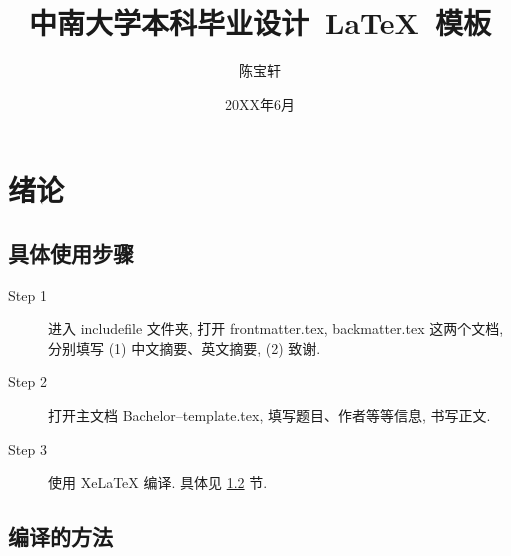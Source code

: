 \documentclass[forprint]{CSUBachelor}
\begin{document}
\title{中南大学本科毕业设计~\LaTeX~模板}
\author{陈宝轩}                            		%

\date{20XX年6月}                    		%

\maketitle
\frontmatter
{}              %
\tableofcontents
\mainmatter
\chapter{绪论}
 \section{具体使用步骤}
 \begin{description}
  \item[Step 1]  进入 includefile 文件夹,  打开 frontmatter.tex, backmatter.tex 这两个文档,
        分别填写 (1) 中文摘要、英文摘要, (2) 致谢.

  \item[Step 2]  打开主文档 Bachelor--template.tex, 填写题目、作者等等信息, 书写正文.

  \item[Step 3]  使用 XeLaTeX 编译. 具体见 \ref{sec-compile} 节.
\end{description}

\section{编译的方法}\label{sec-compile}
\end{document}
